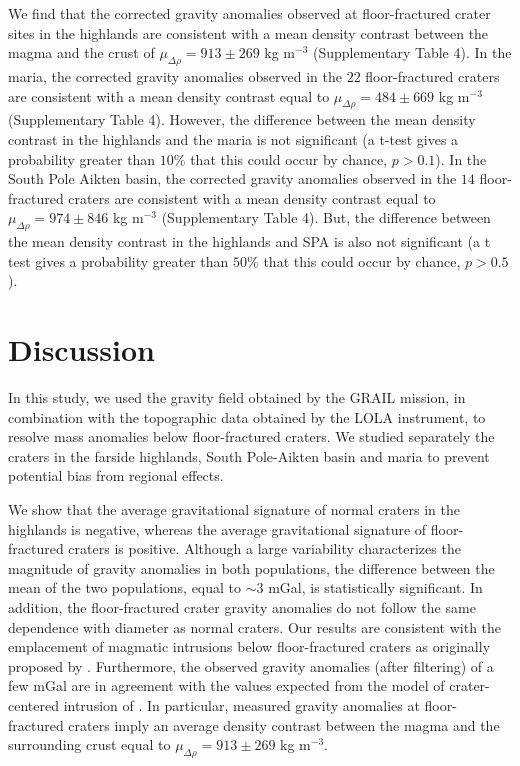 We   find   that  the   corrected   gravity   anomalies  observed   at
floor-fractured crater  sites in the  highlands are consistent  with a
mean   density  contrast   between  the   magma  and   the  crust   of
$\mu_{\Delta \rho}  = 913 \pm  269 $ kg m$^{-3}$  (Supplementary Table
4).  In  the maria,  the corrected gravity  anomalies observed  in the
$22$  floor-fractured  craters  are  consistent with  a  mean  density
contrast  equal to  $\mu_{\Delta  \rho}  = 484  \pm  669$ kg  m$^{-3}$
(Supplementary  Table 4).   However, the  difference between  the mean
density contrast in the highlands and  the maria is not significant (a
t-test gives a  probability greater than $10\%$ that  this could occur
by chance, $p > 0.1$).  In  the South Pole Aikten basin, the corrected
gravity  anomalies observed  in the  $14$ floor-fractured  craters are
consistent    with    a    mean     density    contrast    equal    to
$\mu_{\Delta \rho}  = 974 \pm  846 $ kg m$^{-3}$  (Supplementary Table
4).   But, the  difference between  the mean  density contrast  in the
highlands  and  SPA  is  also  not  significant  (a  t  test  gives  a
probability  greater than  $50\%$  that this  could  occur by  chance,
$p > 0.5$).

\section{Discussion}
\label{sec:discussion}

In  this study,  we  used  the gravity  field  obtained  by the  GRAIL
mission, in combination with the topographic data obtained by the LOLA
instrument, to  resolve mass anomalies below  floor-fractured craters.
We  studied separately  the craters  in the  farside highlands,  South
Pole-Aikten basin  and maria to  prevent potential bias  from regional
effects.

We show that the average  gravitational signature of normal craters in
the highlands is negative, whereas the average gravitational signature
of floor-fractured craters is  positive.  Although a large variability
characterizes the magnitude of  gravity anomalies in both populations,
the  difference between  the mean  of  the two  populations, equal  to
$\sim  3$  mGal,  is  statistically  significant.   In  addition,  the
floor-fractured  crater  gravity  anomalies  do not  follow  the  same
dependence  with   diameter  as  normal  craters.    Our  results  are
consistent  with   the  emplacement   of  magmatic   intrusions  below
floor-fractured     craters     as      originally     proposed     by
\citet{Schultz:1976kt}.  Furthermore,  the observed  gravity anomalies
(after  filtering) of  a few  mGal are  in agreement  with the  values
expected   from   the   model    of   crater-centered   intrusion   of
\citet{Thorey:2014cv}.  In  particular, measured gravity  anomalies at
floor-fractured craters imply an  average density contrast between the
magma      and      the      surrounding      crust      equal      to
$\mu_{\Delta \rho} = 913 \pm 269$ kg m$^{-3}$.

